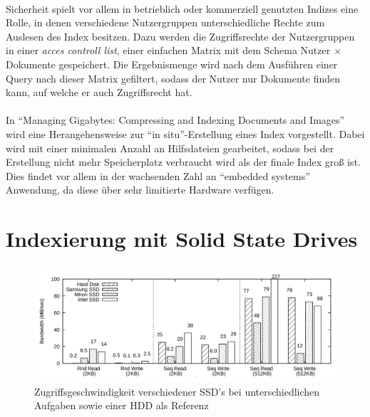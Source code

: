 \paragraph{}
Sicherheit spielt vor allem in betrieblich oder kommerziell genutzten Indizes eine Rolle, in denen verschiedene Nutzergruppen unterschiedliche Rechte zum Auslesen des Index besitzen. Dazu werden die Zugriffsrechte der Nutzergruppen in einer \textit{acces controll list}, einer einfachen Matrix mit dem Schema Nutzer $\times$ Dokumente gespeichert. Die Ergebnismenge wird nach dem Ausführen einer Query nach dieser Matrix gefiltert, sodass der Nutzer nur Dokumente finden kann, auf welche er auch Zugriffsrecht hat.\par

\paragraph{}
In \enquote{Managing Gigabytes: Compressing and Indexing Documents and Images}\cite{managingGig} wird eine Herangehensweise zur \enquote{in situ}-Erstellung eines Index vorgestellt. Dabei wird mit einer minimalen Anzahl an Hilfsdateien gearbeitet, sodass bei der Erstellung nicht mehr Speicherplatz verbraucht wird als der finale Index groß ist. Dies findet vor allem in der wachsenden Zahl an \enquote{embedded systems} Anwendung, da diese über sehr limitierte Hardware verfügen.\par

\section{Indexierung mit Solid State Drives} \label{indexSSD}

\begin{figure}[ht]
  \includegraphics[width=\textwidth,height=.29\textheight]{pdf/ssdperformance.png}
  \caption{Zugriffsgeschwindigkeit verschiedener SSD's bei unterschiedlichen Aufgaben sowie einer HDD als Referenz}
  \label{fig:accessSSD}
\end{figure}

